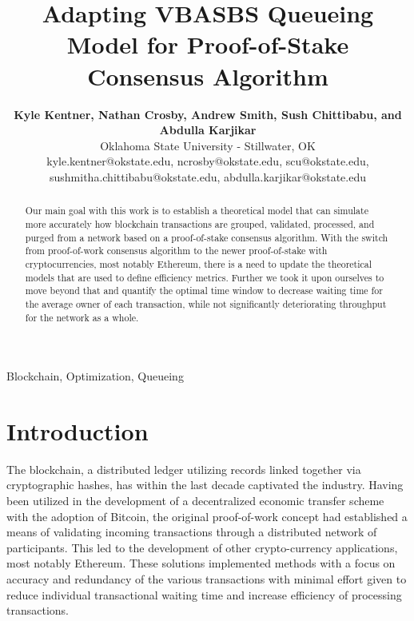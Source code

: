 \documentclass[conference]{IEEEtran}
\begin{document}
\title{Adapting VBASBS Queueing Model for Proof-of-Stake Consensus Algorithm}

\author{
  \textbf{Kyle Kentner, Nathan Crosby, Andrew Smith, Sush Chittibabu, and Abdulla Karjikar}\\
  Oklahoma State University - Stillwater, OK \\
  kyle.kentner@okstate.edu, ncrosby@okstate.edu, scu@okstate.edu, \\
  sushmitha.chittibabu@okstate.edu, abdulla.karjikar@okstate.edu}

\maketitle

\begin{abstract}

Our main goal with this work is to establish a theoretical model that can simulate
more accurately how blockchain transactions are grouped, validated, processed,
and purged from a network based on a proof-of-stake consensus algorithm. With 
the switch from proof-of-work consensus algorithm to the newer proof-of-stake with 
cryptocurrencies, most notably Ethereum, there is a need to update the theoretical 
models that are used to define efficiency metrics. Further we took it upon ourselves 
to move beyond that and quantify the optimal time window to decrease waiting time
for the average owner of each transaction, while not significantly deteriorating throughput
for the network as a whole.

\end{abstract}

\begin{IEEEkeywords}
Blockchain, Optimization, Queueing
\end{IEEEkeywords}

\section{Introduction}\label{Intro}

The blockchain, a distributed ledger utilizing records linked together via cryptographic 
hashes, has within the last decade captivated the industry. Having been utilized in the 
development of a decentralized economic transfer scheme with the adoption of 
Bitcoin\cite{2008_Bitcoin_Nakamoto}, the original proof-of-work concept had established 
a means of validating incoming transactions through a distributed network of participants. 
This led to the development of other crypto-currency applications, most notably Ethereum. 
These solutions implemented methods with a focus on accuracy and redundancy of the 
various transactions with minimal effort given to reduce individual transactional waiting 
time and increase efficiency of processing transactions.
\end{document}
